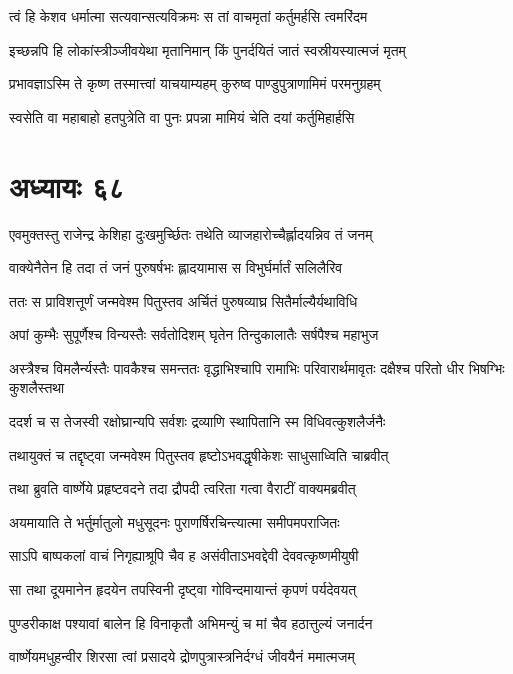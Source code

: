\twolineshloka
{त्वं हि केशव धर्मात्मा सत्यवान्सत्यविक्रमः}
{स तां वाचमृतां कर्तुमर्हसि त्वमरिंदम}


\twolineshloka
{इच्छन्नपि हि लोकांस्त्रीञ्जीवयेथा मृतानिमान्}
{किं पुनर्दयितं जातं स्वस्रीयस्यात्मजं मृतम्}


\twolineshloka
{प्रभावज्ञाऽस्मि ते कृष्ण तस्मात्त्वां याचयाम्यहम्}
{कुरुष्व पाण्डुपुत्राणामिमं परमनुग्रहम्}


\twolineshloka
{स्वसेति वा महाबाहो हतपुत्रेति वा पुनः}
{प्रपन्ना मामियं चेति दयां कर्तुमिहार्हसि}


\chapter{अध्यायः ६८}
\twolineshloka
{एवमुक्तस्तु राजेन्द्र केशिहा दुःखमुर्च्छितः}
{तथेति व्याजहारोच्चैर्ह्लादयन्निव तं जनम्}


\twolineshloka
{वाक्येनैतेन हि तदा तं जनं पुरुषर्षभः}
{ह्लादयामास स विभुर्घर्मार्तं सलिलैरिव}


\twolineshloka
{ततः स प्राविशत्तूर्णं जन्मवेश्म पितुस्तव}
{अर्चितं पुरुषव्याघ्र सितैर्माल्यैर्यथाविधि}


\twolineshloka
{अपां कुम्भैः सुपूर्णैश्च विन्यस्तैः सर्वतोदिशम्}
{घृतेन तिन्दुकालातैः सर्षपैश्च महाभुज}


\threelineshloka
{अस्त्रैश्च विमलैर्न्यस्तैः पावकैश्च समन्ततः}
{वृद्धाभिश्चापि रामाभिः परिवारार्थमावृतः}
{दक्षैश्च परितो धीर भिषग्भिः कुशलैस्तथा}


\twolineshloka
{ददर्श च स तेजस्वी रक्षोघ्रान्यपि सर्वशः}
{द्रव्याणि स्थापितानि स्म विधिवत्कुशलैर्जनैः}


\twolineshloka
{तथायुक्तं च तद्दृष्ट्वा जन्मवेश्म पितुस्तव}
{हृष्टोऽभवद्धृषीकेशः साधुसाध्विति चाब्रवीत्}


\twolineshloka
{तथा ब्रुवति वार्ष्णेये प्रहृष्टवदने तदा}
{द्रौपदी त्वरिता गत्वा वैराटीं वाक्यमब्रवीत्}


\twolineshloka
{अयमायाति ते भर्तुर्मातुलो मधुसूदनः}
{पुराणर्षिरचिन्त्यात्मा समीपमपराजितः}


\twolineshloka
{साऽपि बाष्पकलां वाचं निगृह्याश्रूपि चैव ह}
{असंवीताऽभवद्देवी देववत्कृष्णमीयुषी}


\twolineshloka
{सा तथा दूयमानेन हृदयेन तपस्विनी}
{दृष्ट्वा गोविन्दमायान्तं कृपणं पर्यदेवयत्}


\twolineshloka
{पुण्डरीकाक्ष पश्यावां बालेन हि विनाकृतौ}
{अभिमन्युं च मां चैव हठात्तुल्यं जनार्दन}


\twolineshloka
{वार्ष्णेयमधुहन्वीर शिरसा त्वां प्रसादये}
{द्रोणपुत्रास्त्रनिर्दग्धं जीवयैनं ममात्मजम्}


